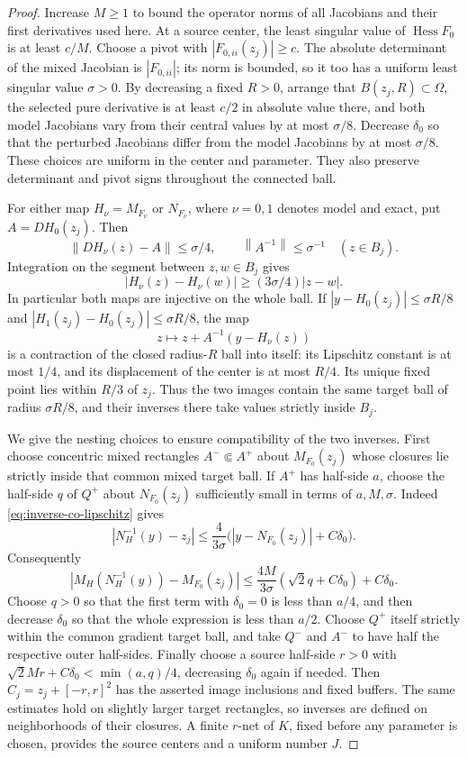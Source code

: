 \documentclass[11pt,a4paper]{article}
\numberwithin{equation}{section}
\theoremstyle{remark}
\newcommand{\norm}[1]{\left\lVert #1\right\rVert}
\DeclareMathOperator{\Hess}{Hess}
\begin{document}
\begin{proof}
Increase $M\ge1$ to bound the operator norms of all Jacobians and their
first derivatives used here. At a source center, the least singular value
of $\Hess F_0$ is at least $c/M$. Choose a pivot with
$|F_{0,ii}(z_j)|\ge c$. The absolute determinant of the mixed Jacobian is
$|F_{0,ii}|$; its norm is bounded, so it too has a uniform least singular
value $\sigma>0$.
By decreasing a fixed $R>0$, arrange that $B(z_j,R)\subset\Omega$,
the selected pure derivative is at least $c/2$ in absolute value there,
and both model Jacobians vary from their central values by at most
$\sigma/8$. Decrease $\delta_0$ so that the perturbed Jacobians differ
from the model Jacobians by at most $\sigma/8$. These choices are uniform
in the center and parameter. They also preserve determinant and pivot
signs throughout the connected ball.

For either map $H_\nu=M_{F_\nu}$ or $N_{F_\nu}$, where $\nu=0,1$
denotes model and exact, put $A=DH_0(z_j)$. Then
\[
 \norm{DH_\nu(z)-A}\le\sigma/4,\qquad \norm{A^{-1}}\le\sigma^{-1}
 \quad(z\in B_j).
\]
Integration on the segment between $z,w\in B_j$ gives
\begin{equation}\label{eq:inverse-co-lipschitz}
 |H_\nu(z)-H_\nu(w)|\ge(3\sigma/4)|z-w|.
\end{equation}
In particular both maps are injective on the whole ball. If
$|y-H_0(z_j)|\le\sigma R/8$ and
$|H_1(z_j)-H_0(z_j)|\le\sigma R/8$, the map
\[
 z\longmapsto z+A^{-1}(y-H_\nu(z))
\]
is a contraction of the closed radius-$R$ ball into itself: its Lipschitz
constant is at most $1/4$, and its displacement of the center is at most
$R/4$. Its unique fixed point lies within $R/3$ of $z_j$.
Thus the two images contain the same target ball of radius $\sigma R/8$,
and their inverses there take values strictly inside $B_j$.

We give the nesting choices to ensure compatibility of the two inverses.
First choose concentric mixed rectangles $A^-\Subset A^+$ about
$M_{F_0}(z_j)$ whose closures lie strictly inside that common mixed
target ball. If $A^+$ has half-side $a$, choose the half-side $q$ of
$Q^+$ about $N_{F_0}(z_j)$ sufficiently small in terms of $a,M,\sigma$.
Indeed \eqref{eq:inverse-co-lipschitz} gives
\[
 |N_H^{-1}(y)-z_j|
 \le \frac4{3\sigma}
       \bigl(|y-N_{F_0}(z_j)|+C\delta_0\bigr).
\]
Consequently
\[
 |M_H(N_H^{-1}(y))-M_{F_0}(z_j)|
 \le \frac{4M}{3\sigma}(\sqrt2q+C\delta_0)+C\delta_0.
\]
Choose $q>0$ so that the first term with $\delta_0=0$ is less than
$a/4$, and then decrease $\delta_0$ so that the whole expression is less
than $a/2$. Choose $Q^+$ itself strictly within the common gradient
target ball, and take $Q^-$ and $A^-$ to have half the respective outer
half-sides. Finally choose a source half-side $r>0$ with
$\sqrt2Mr+C\delta_0<\min(a,q)/4$, decreasing $\delta_0$ again if needed.
Then $C_j=z_j+[-r,r]^2$ has the asserted image inclusions and fixed
buffers. The same estimates hold on slightly larger target rectangles,
so inverses are defined on neighborhoods of their closures. A finite
$r$-net of $K$, fixed before any parameter is chosen, provides the source
centers and a uniform number $J$.


\end{proof}
\end{document}
